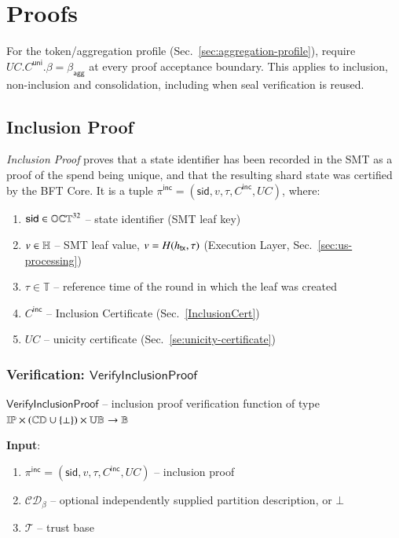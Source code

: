 \section{Proofs}\label{se:proofs}

For the token/aggregation profile (Sec.~\ref{sec:aggregation-profile}), require $UC.C^\mathsf{uni}.\beta=\beta_{\mathsf{agg}}$ at every proof acceptance boundary. This applies to inclusion, non-inclusion and consolidation, including when seal verification is reused.


\subsection{Inclusion Proof}

\emph{Inclusion Proof} proves that a state identifier has been recorded in the SMT as a proof of the spend being unique, and that the resulting shard state was certified by the BFT Core. It is a tuple $\pi^\mathsf{inc} = (\mathsf{sid}, v, \tau, C^\mathsf{inc}, UC)$, where:
\begin{enumerate}
	\item $\mathsf{sid} \in \mathbb{OCT}^{32}$ -- state identifier (SMT leaf key)
	\item $v \in \mathbb{H}$ -- SMT leaf value, $v = H({h_\mathsf{tx}},\tau)$ (Execution Layer, Sec.~\ref{sec:us-processing})
	\item $\tau \in \mathbb T$ -- reference time of the round in which the leaf was created
	\item $C^\mathsf{inc}$ -- Inclusion Certificate (Sec.~\ref{InclusionCert})
	\item $UC$ -- unicity certificate (Sec.~\ref{se:unicity-certificate})
\end{enumerate}

\subsubsection{Verification: $\mathsf{VerifyInclusionProof}$}\label{VerifyInclusionProof}

$\mathsf{VerifyInclusionProof}$ -- inclusion proof verification function of type $\mathbb{IP} \times (\mathbb{CD}\cup\{\bot\}) \times \mathbb{UB} \to \mathbb{B}$

\textbf{Input}:
\begin{enumerate}
	\item $\pi^\mathsf{inc} = (\mathsf{sid}, v, \tau, C^\mathsf{inc}, UC)$ -- inclusion proof
	\item $\mathcal{CD}_\beta$ -- optional independently supplied partition description, or $\bot$
	\item $\mathcal{T}$ -- trust base
\end{enumerate}

